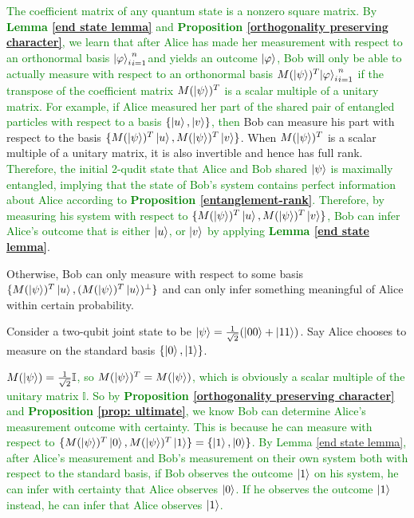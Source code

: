 \textcolor{green}{The coefficient matrix of any quantum state is a nonzero square matrix. By \textbf{Lemma \ref{end state lemma}} and \textbf{Proposition \ref{orthogonality preserving character}}, we learn that after Alice has made her measurement with respect to an orthonormal basis ${\ket{\varphi}_i}_{i=1}^n$and yields an outcome $\ket{\varphi}$, Bob will only be able to actually measure with respect to an orthonormal basis $M(\ket{\psi})^T {\ket{\varphi}_i}_{i=1}^n$ if the transpose of the coefficient matrix $M(\ket{\psi})^T$ is a scalar multiple of a unitary matrix. For example, if Alice measured her part of the shared pair of entangled particles with respect to a basis $\{\ket{u}, \ket{v}\}$, then }
Bob can measure his part with respect to the basis $\{M(\ket{\psi})^T\ket{u}, M(\ket{\psi})^T\ket{v}\}$. When $M(\ket{\psi})^T$ is a scalar multiple of a unitary matrix, it is also invertible and hence has full rank. \textcolor{green}{Therefore, the initial 2-qudit state that Alice and Bob shared $\ket{\psi}$ is maximally entangled, implying that the state of Bob's system contains perfect information about Alice according to \textbf{Proposition \ref{entanglement-rank}}. Therefore, by measuring his system with respect to $\{M(\ket{\psi})^T\ket{u}, M(\ket{\psi})^T\ket{v}\}$, Bob can infer Alice's outcome that is either $\ket{u}$, or $\ket{v}$ by applying \textbf{Lemma \ref{end state lemma}}}. 

Otherwise, Bob can only measure with respect to some basis $\{M(\ket{\psi})^T\ket{u}, (M(\ket{\psi})^T\ket{u})^\perp \}$ and can only infer something meaningful of Alice within certain probability.

\begin{example}
Consider a two-qubit joint state to be $\ket{\psi}=\frac{1}{\sqrt{2}}(\ket{00}+\ket{11})$. Say Alice chooses to measure on the standard basis $\{\ket{0}, \ket{1}\}$.

\textcolor{green}{$M(\ket{\psi})=\frac{1}{\sqrt{2}}\mathbb{I}$, so $M(\ket{\psi})^T=M(\ket{\psi})$, which is obviously a scalar multiple of the unitary matrix $\mathbb{I}$. So by \textbf{Proposition \ref{orthogonality preserving character}} and \textbf{Proposition \ref{prop: ultimate}}, we know Bob can determine Alice's measurement outcome with certainty. This is because he can measure with respect to  $\{M(\ket{\psi})^T\ket{0}, M(\ket{\psi})^T\ket{1}\}=\{\ket{1}, \ket{0}\}$. By Lemma \ref{end state lemma}, after Alice's measurement and Bob's measurement on their own system both with respect to the standard basis, if Bob observes the outcome $\ket{1}$ on his system, he can infer with certainty that Alice observes $\ket{0}$. If he observes the outcome $\ket{1}$ instead, he can infer that Alice observes $\ket{1}$.}
\end{example}

